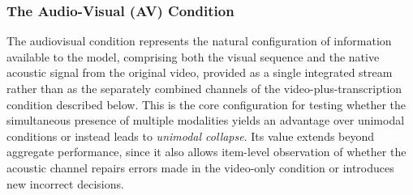 \subsubsection*{The Audio-Visual (AV) Condition}
The audiovisual condition represents the natural configuration of information available to the model, comprising both the visual sequence and the native acoustic signal from the original video, provided as a single integrated stream rather than as the separately combined channels of the video-plus-transcription condition described below. This is the core configuration for testing whether the simultaneous presence of multiple modalities yields an advantage over unimodal conditions or instead leads to \textit{unimodal collapse}. Its value extends beyond aggregate performance, since it also allows item-level observation of whether the acoustic channel repairs errors made in the video-only condition or introduces new incorrect decisions.
